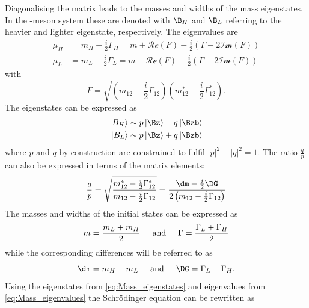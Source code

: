 Diagonalising the matrix leads to the masses and widths of the mass eigenstates.
In the \Bz-meson system these are denoted with $\B_H$ and $\B_L$ referring to the heavier and lighter eigenstate, respectively.
The eigenvalues are
\begin{equation}
\begin{split}
\mu_H &= m_H-\frac{i}{2}\Gamma_H = m + \mathcal{Re}\left(F\right)-\frac{i}{2}\left(\Gamma-2\mathcal{Im}\left(F\right)\right)\\
\mu_L &= m_L-\frac{i}{2}\Gamma_L = m - \mathcal{Re}\left(F\right)-\frac{i}{2}\left(\Gamma+2\mathcal{Im}\left(F\right)\right)\label{eq:Mass_eigenvalues}
\end{split}
\end{equation}
with
\begin{equation}
F=\sqrt{\left(m_{12}-\frac{i}{2}\Gamma_{12}\right)\left(m_{12}^\ast-\frac{i}{2}\Gamma_{12}^\ast\right)}.
\end{equation}
The eigenstates can be expressed as
\begin{equation}
\begin{split}
\left|B_H\right>&\sim p\left|\Bz\right>-q\left|\Bzb\right>\\
\left|B_L\right>&\sim p\left|\Bz\right>+q\left|\Bzb\right>\label{eq:Mass_eigenstates}
\end{split}
\end{equation}
where $p$ and $q$ by construction are constrained to fulfil $\left|p\right|^2+\left|q\right|^2=1$.
The ratio $\frac{q}{p}$ can also be expressed in terms of the matrix elements:
\begin{equation}
\frac{q}{p}=\sqrt{ \frac{ m_{12}^\ast-\frac{i}{2}\Gamma_{12}^\ast }{ m_{12}-\frac{i}{2}\Gamma_{12} }}
=\frac{\dm-\frac{i}{2}\DG}{2\left(m_{12}-\frac{i}{2}\Gamma_{12}\right)}\label{eq:qoverp}
\end{equation}
The masses and widths of the initial states can be expressed as
\begin{equation}
m=\frac{m_L+m_H}{2}\hspace{0.5cm}\text{and}\hspace{0.5cm}\Gamma=\frac{\Gamma_L+\Gamma_H}{2}
\end{equation}
while the corresponding differences will be referred to as
\begin{equation}
\dm=m_H-m_L\hspace{0.5cm}\text{and}\hspace{0.5cm}\DG=\Gamma_L-\Gamma_H.
\end{equation}
Using the eigenstates from \cref{eq:Mass_eigenstates} and eigenvalues from \cref{eq:Mass_eigenvalues} the Schrödinger equation can be rewritten as
